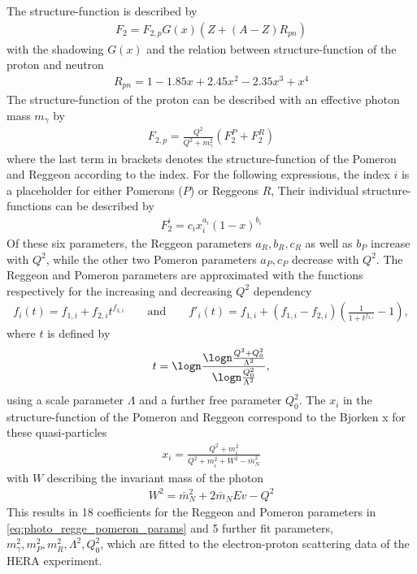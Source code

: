 The structure-function is described by
\begin{align}
    F_2 = F_{2,p} G(x) (Z + (A - Z) R_{pn})
\end{align}
with the shadowing $G(x)$ and the relation between structure-function of the proton and neutron
\begin{align}
    R_{pn} = 1 - 1.85 x + 2.45 x^2 - 2.35 x^3 + x^4
\end{align}
The structure-function of the proton can be described with an effective photon mass $m_\gamma$ by
\begin{align}
    F_{2,p} = \frac{Q^2}{Q^2 + m_\gamma^2} (F_2^P + F_2^R)
\end{align}
where the last term in brackets denotes the structure-function of the Pomeron and Reggeon according to the index.
For the following expressions, the index $i$ is a placeholder for either Pomerons ($P$) or Reggeons $R$,
Their individual structure-functions can be described by
\begin{align}
    F_2^i = c_i x_i^{a_i} (1 - x)^{b_i}
\end{align}
Of these six parameters, the Reggeon parameters $a_R, b_R, c_R$ as well as $b_P$ increase with $Q^2$, while the other two Pomeron parameters $a_P, c_P$ decrease with $Q^2$.
The Reggeon and Pomeron parameters are approximated with the functions respectively for the increasing and decreasing $Q^2$ dependency
\begin{align} \label{eq:photo_regge_pomeron_params}
    f_i(t) = f_{1,i} + f_{2,i} t^{f_{3,i}}
    \qquad \text{and} \qquad
    f'_i(t) = f_{1,i} + (f_{1,i} - f_{2,i}) \left( \frac{1}{1 + t^{f_{3,i}}} - 1 \right) ,
\end{align}
where $t$ is defined by
\begin{align}
    t = \logn \frac{\logn \frac{Q^2 + Q_0^2}{\Lambda^2}}{\logn \frac{Q_0^2}{\Lambda^2}} ,
\end{align}
using a scale parameter $\Lambda$ and a further free parameter $Q_0^2$.
The $x_i$ in the structure-function of the Pomeron and Reggeon correspond to the Bjorken x for these quasi-particles
\begin{align}
    x_i = \frac{Q^2 + m_i^2}{Q^2 + m_i^2 + W^2 - \bar{m}_N^2}
\end{align}
with $W$ describing the invariant mass of the photon
\begin{align}
    W^2 = \bar{m}_N^2 + 2\bar{m}_N E v - Q^2
\end{align}
This results in 18 coefficients for the Reggeon and Pomeron parameters in \eqref{eq:photo_regge_pomeron_params} and 5 further fit parameters, $m_\gamma^2, m_P^2, m_R^2, \Lambda^2, Q_0^2$, which are fitted to the electron-proton scattering data of the HERA experiment.

